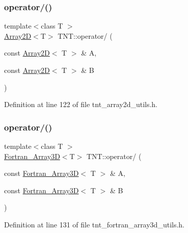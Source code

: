 \subsubsection{\texorpdfstring{operator/()}{operator/()}\hspace{0.1cm}{\footnotesize\ttfamily [4/5]}}
{\footnotesize\ttfamily template$<$class T $>$ \\
\hyperlink{classTNT_1_1Array2D}{Array2D}$<$T$>$ T\+N\+T\+::operator/ (\begin{DoxyParamCaption}\item[{const \hyperlink{classTNT_1_1Array2D}{Array2D}$<$ T $>$ \&}]{A,  }\item[{const \hyperlink{classTNT_1_1Array2D}{Array2D}$<$ T $>$ \&}]{B }\end{DoxyParamCaption})}



Definition at line 122 of file tnt\+\_\+array2d\+\_\+utils.\+h.

\mbox{\label{namespaceTNT_ae8a226ec8d85aa84a8f321ab3556c7a0}} 
\subsubsection{\texorpdfstring{operator/()}{operator/()}\hspace{0.1cm}{\footnotesize\ttfamily [5/5]}}
{\footnotesize\ttfamily template$<$class T $>$ \\
\hyperlink{classTNT_1_1Fortran__Array3D}{Fortran\+\_\+\+Array3D}$<$T$>$ T\+N\+T\+::operator/ (\begin{DoxyParamCaption}\item[{const \hyperlink{classTNT_1_1Fortran__Array3D}{Fortran\+\_\+\+Array3D}$<$ T $>$ \&}]{A,  }\item[{const \hyperlink{classTNT_1_1Fortran__Array3D}{Fortran\+\_\+\+Array3D}$<$ T $>$ \&}]{B }\end{DoxyParamCaption})}



Definition at line 131 of file tnt\+\_\+fortran\+\_\+array3d\+\_\+utils.\+h.

\mbox{\label{namespaceTNT_a3be75d39e2081a4f4876050b36b29403}} 
